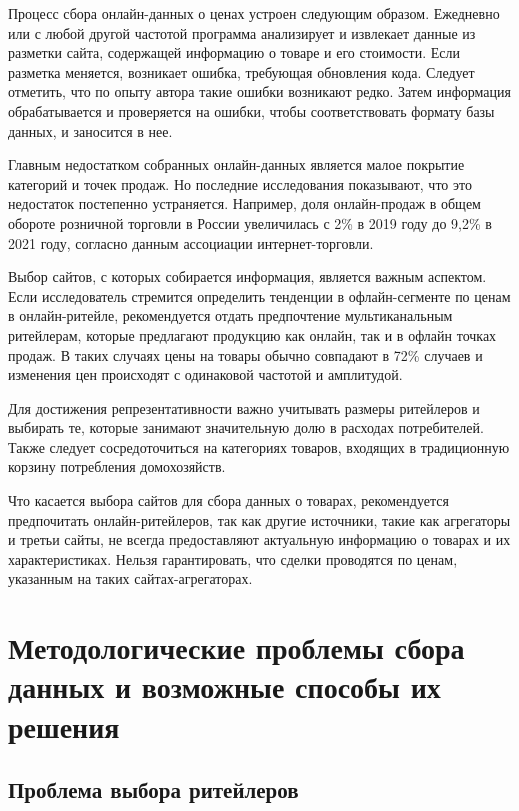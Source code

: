 Процесс сбора онлайн-данных о ценах устроен следующим образом. Ежедневно или с любой другой частотой программа анализирует и извлекает данные из разметки сайта, содержащей информацию о товаре и его стоимости. Если разметка меняется, возникает ошибка, требующая обновления кода. Следует отметить, что по опыту автора такие ошибки возникают редко. Затем информация обрабатывается и проверяется на ошибки, чтобы соответствовать формату базы данных, и заносится в нее.

Главным недостатком собранных онлайн-данных является малое покрытие категорий и точек продаж. Но последние исследования показывают, что это недостаток постепенно устраняется. Например, доля онлайн-продаж в общем обороте розничной торговли в России увеличилась с 2\% в 2019 году до 9,2\% в 2021 году, согласно данным ассоциации интернет-торговли.

Выбор сайтов, с которых собирается информация, является важным аспектом. Если исследователь стремится определить тенденции в офлайн-сегменте по ценам в онлайн-ритейле, рекомендуется отдать предпочтение мультиканальным ритейлерам, которые предлагают продукцию как онлайн, так и в офлайн точках продаж. В таких случаях цены на товары обычно совпадают в 72\% случаев и изменения цен происходят с одинаковой частотой и амплитудой.

Для достижения репрезентативности важно учитывать размеры ритейлеров и выбирать те, которые занимают значительную долю в расходах потребителей. Также следует сосредоточиться на категориях товаров, входящих в традиционную корзину потребления домохозяйств.

Что касается выбора сайтов для сбора данных о товарах, рекомендуется предпочитать онлайн-ритейлеров, так как другие источники, такие как агрегаторы и третьи сайты, не всегда предоставляют актуальную информацию о товарах и их характеристиках. Нельзя гарантировать, что сделки проводятся по ценам, указанным на таких сайтах-агрегаторах.

\section{Методологические проблемы сбора данных и возможные способы их решения}\label{sec:ch2/sec2}


\subsection{Проблема выбора ритейлеров}\label{subsec:ch2/sec2/sub1}

